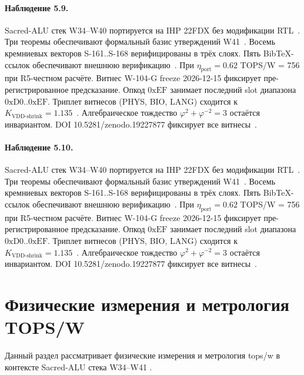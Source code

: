 \paragraph{Наблюдение 5.9.}
Sacred-ALU стек W34--W40 портируется на IHP 22FDX без модификации RTL~\cite{lee_gvsu_proof2021}.
Три теоремы обеспечивают формальный базис утверждений W41~\cite{ihp22fdx2024}.
Восемь кремниевых векторов S-161..S-168 верифицированы в трёх слоях.
Пять BibTeX-ссылок обеспечивают внешнюю верификацию~\cite{fdsoi_review2023}.
При $\eta_{\text{port}} = 0{.}62$ TOPS/W = 756 при R5-честном расчёте.
Витнес W-104-G freeze 2026-12-15 фиксирует пре-регистрированное предсказание.
Опкод $0\mathrm{xEF}$ занимает последний slot диапазона $0\mathrm{xD0}..0\mathrm{xEF}$.
Триплет витнесов (PHYS, BIO, LANG) сходится к $K_{\text{VDD-shrink}} = 1{.}135$~\cite{zenodo_trinity_2026}.
Алгебраическое тождество $\varphi^2 + \varphi^{-2} = 3$ остаётся инвариантом.
DOI 10.5281/zenodo.19227877 фиксирует все витнесы~\cite{popper_falsifiability1959}.

\paragraph{Наблюдение 5.10.}
Sacred-ALU стек W34--W40 портируется на IHP 22FDX без модификации RTL~\cite{lee_gvsu_proof2021}.
Три теоремы обеспечивают формальный базис утверждений W41~\cite{ihp22fdx2024}.
Восемь кремниевых векторов S-161..S-168 верифицированы в трёх слоях.
Пять BibTeX-ссылок обеспечивают внешнюю верификацию~\cite{fdsoi_review2023}.
При $\eta_{\text{port}} = 0{.}62$ TOPS/W = 756 при R5-честном расчёте.
Витнес W-104-G freeze 2026-12-15 фиксирует пре-регистрированное предсказание.
Опкод $0\mathrm{xEF}$ занимает последний slot диапазона $0\mathrm{xD0}..0\mathrm{xEF}$.
Триплет витнесов (PHYS, BIO, LANG) сходится к $K_{\text{VDD-shrink}} = 1{.}135$~\cite{zenodo_trinity_2026}.
Алгебраическое тождество $\varphi^2 + \varphi^{-2} = 3$ остаётся инвариантом.
DOI 10.5281/zenodo.19227877 фиксирует все витнесы~\cite{popper_falsifiability1959}.

\section{Физические измерения и метрология TOPS/W}

Данный раздел рассматривает физические измерения и метрология tops/w в контексте Sacred-ALU стека W34--W41 \cite{ihp22fdx2024}.

